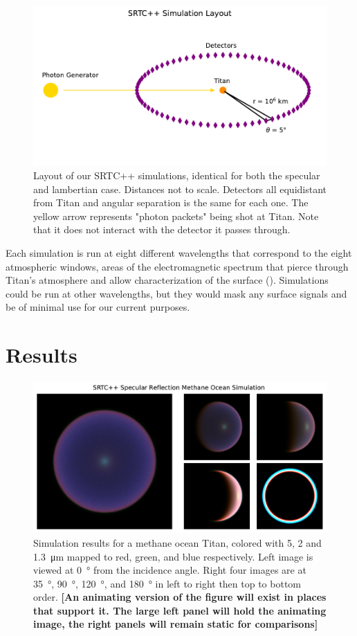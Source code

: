 \documentclass[linenumbers]{aastex631}
\begin{document}
\begin{figure}[htbp]
\includegraphics[scale = 0.5]{SRTCLayout.pdf}
\centering
\caption{Layout of our SRTC++ simulations, identical for both the specular and lambertian case. Distances not to scale. Detectors all equidistant from Titan and angular separation is the same for each one. The yellow arrow represents "photon packets" being shot at Titan. Note that it does not interact with the detector it passes through.}
\label{fig:5}
\end{figure}

Each simulation is run at eight different wavelengths that correspond to the eight atmospheric windows, areas of the electromagnetic spectrum that pierce through Titan's atmosphere and allow characterization of the surface (\cite{Barnes2007}). Simulations could be run at other wavelengths, but they would mask any surface signals and be of minimal use for our current purposes. 

\section{Results}

\begin{figure}[htbp]
\includegraphics[scale = 0.5]{SpecularSim.pdf}
\centering
\caption{Simulation results for a methane ocean Titan, colored with 5, 2 and \qty{1.3}{\micro\meter} mapped to red, green, and blue respectively. Left image is viewed at \qty{0}{\degree} from the incidence angle. Right four images are at  \qty{35}{\degree},  \qty{90}{\degree},  \qty{120}{\degree}, and  \qty{180}{\degree} in left to right then top to bottom order. \textbf{\color{red} [An animating version of the figure will exist in places that support it. The large left panel will hold the animating image, the right panels will remain static for comparisons] \color{black}}}
\label{fig:6}
\end{figure}
\end{document}
